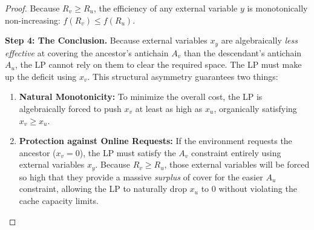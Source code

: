 \documentclass[a4paper]{article}
\begin{document}
\begin{proof}
Because $R_v \ge R_u$, the efficiency of any external variable $y$ is monotonically non-increasing: $f(R_v) \le f(R_u)$.

\textbf{Step 4: The Conclusion.} Because external variables $x_y$ are algebraically \textit{less effective} at covering the ancestor's antichain $A_v$ than the descendant's antichain $A_u$, the LP cannot rely on them to clear the required space. The LP must make up the deficit using $x_v$. This structural asymmetry guarantees two things:
\begin{enumerate}
    \item \textbf{Natural Monotonicity:} To minimize the overall cost, the LP is algebraically forced to push $x_v$ at least as high as $x_u$, organically satisfying $x_v \ge x_u$.
    \item \textbf{Protection against Online Requests:} If the environment requests the ancestor ($x_v = 0$), the LP must satisfy the $A_v$ constraint entirely using external variables $x_y$. Because $R_v \ge R_u$, those external variables will be forced so high that they provide a massive \textit{surplus} of cover for the easier $A_u$ constraint, allowing the LP to naturally drop $x_u$ to $0$ without violating the cache capacity limits.
\end{enumerate}
\end{proof}

\printbibliography
\end{document}
